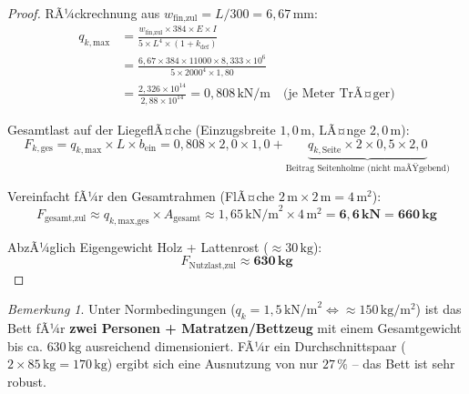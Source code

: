 ﻿\documentclass[12pt,a4paper]{article}
\theoremstyle{definition}
\theoremstyle{plain}
\theoremstyle{remark}
\newtheorem{bemerkung}{Bemerkung}
\begin{document}
\begin{proof}
RÃ¼ckrechnung aus $w_{\text{fin,zul}} = L/300 = 6{,}67\,\text{mm}$:
\begin{align*}
  q_{k,\text{max}} &= \frac{w_{\text{fin,zul}} \times 384 \times E \times I}
                         {5 \times L^4 \times (1+k_{\text{def}})} \\
                   &= \frac{6{,}67 \times 384 \times 11000 \times 8{,}333\times10^6}
                           {5 \times 2000^4 \times 1{,}80} \\
                   &= \frac{2{,}326 \times 10^{14}}{2{,}88 \times 10^{14}}
                    = 0{,}808\,\text{kN/m} \quad \text{(je Meter TrÃ¤ger)}
\end{align*}

Gesamtlast auf der LiegeflÃ¤che (Einzugsbreite $1{,}0\,\text{m}$, LÃ¤nge $2{,}0\,\text{m}$):
\begin{equation*}
  F_{k,\text{ges}} = q_{k,\text{max}} \times L \times b_{\text{ein}}
                   = 0{,}808 \times 2{,}0 \times 1{,}0
                   + \underbrace{q_{k,\text{Seite}} \times 2 \times 0{,}5 \times 2{,}0}
                     _{\text{Beitrag Seitenholme (nicht maÃŸgebend)}}
\end{equation*}

Vereinfacht fÃ¼r den Gesamtrahmen (FlÃ¤che $2\,\text{m} \times 2\,\text{m} = 4\,\text{m}^2$):
\begin{equation}
  \boxed{F_{\text{gesamt,zul}} \approx q_{k,\text{max,ges}} \times A_{\text{gesamt}}
  \approx 1{,}65\,\text{kN/m}^2 \times 4\,\text{m}^2 = \mathbf{6{,}6\,\text{kN} = 660\,\text{kg}}}
\end{equation}

AbzÃ¼glich Eigengewicht Holz + Lattenrost ($\approx 30\,\text{kg}$):
\begin{equation}
  \boxed{F_{\text{Nutzlast,zul}} \approx \mathbf{630\,\text{kg}}}
\end{equation}
\end{proof}

\begin{bemerkung}
  Unter Normbedingungen ($q_k = 1{,}5\,\text{kN/m}^2 \Leftrightarrow \approx 150\,\text{kg}/\text{m}^2$)
  ist das Bett fÃ¼r \textbf{zwei Personen + Matratzen/Bettzeug} mit einem
  Gesamtgewicht bis ca. $630\,\text{kg}$ ausreichend dimensioniert. FÃ¼r ein
  Durchschnittspaar ($2 \times 85\,\text{kg} = 170\,\text{kg}$) ergibt sich eine
  Ausnutzung von nur $27\,\%$ -- das Bett ist sehr robust.
\end{bemerkung}
\end{document}
